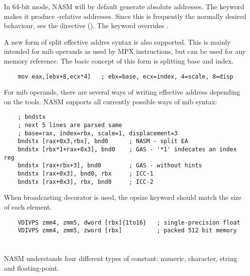 In 64-bit mode, NASM will by default generate absolute addresses. The
 keyword makes it produce -relative addresses.
Since this is frequently the normally desired behaviour, see the 
directive (). The keyword  overrides
.

A new form of split effective addres syntax is also supported. This is
mainly intended for mib operands as used by MPX instructions, but can
be used for any memory reference. The basic concept of this form is
splitting base and index.

\begin{lstlisting}
	mov eax,[ebx+8,ecx*4]   ; ebx=base, ecx=index, 4=scale, 8=disp
\end{lstlisting}

For mib operands, there are several ways of writing effective address
depending on the tools. NASM supports all currently possible ways of
mib syntax:

\begin{lstlisting}
	; bndstx
	; next 5 lines are parsed same
	; base=rax, index=rbx, scale=1, displacement=3
	bndstx [rax+0x3,rbx], bnd0      ; NASM - split EA
	bndstx [rbx*1+rax+0x3], bnd0    ; GAS - '*1' indecates an index reg
	bndstx [rax+rbx+3], bnd0        ; GAS - without hints
	bndstx [rax+0x3], bnd0, rbx     ; ICC-1
	bndstx [rax+0x3], rbx, bnd0     ; ICC-2
\end{lstlisting}

When broadcasting decorator is used, the opsize keyword should match
the size of each element.

\begin{lstlisting}
	VDIVPS zmm4, zmm5, dword [rbx]{1to16}   ; single-precision float
	VDIVPS zmm4, zmm5, zword [rbx]          ; packed 512 bit memory
\end{lstlisting}

\section{}
\label{sec:const}

NASM understands four different types of constant: numeric,
character, string and floating-point.

\subsection{}
\label{subsec:numconst}

